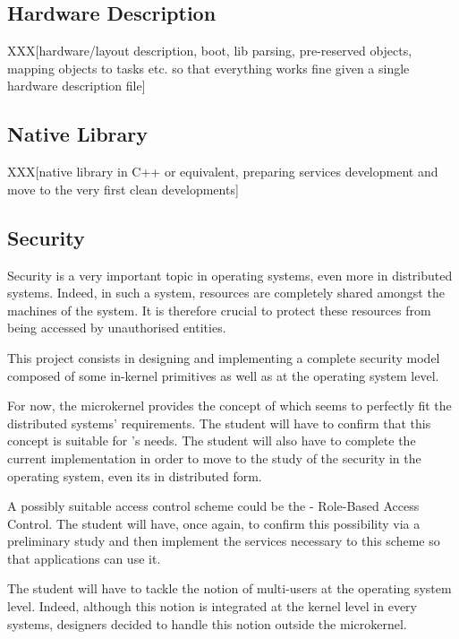 \begin{multicols}{2}
%
%

\subsection{Hardware Description}

XXX[hardware/layout description, boot, lib parsing, pre-reserved objects,
    mapping objects to tasks etc. so that everything works fine given a
    single hardware description file]

%
%

\subsection{ Native Library}

XXX[native library in C++ or equivalent, preparing services development
    and move to the very first clean developments]

%
%

\subsection{Security}

Security is a very important topic in operating systems, even more in
distributed systems. Indeed, in such a system, resources are completely
shared amongst the machines of the system. It is therefore crucial to protect
these resources from being accessed by unauthorised entities.

This project consists in designing and implementing a complete security
model composed of some in-kernel primitives as well as at the operating
system level.

For now, the  microkernel provides the concept of 
which seems to perfectly fit the distributed systems' requirements. The student
will have to confirm that this concept is suitable for 's needs. The
student will also have to complete the current implementation in order to move
to the study of the security in the operating system, even its in distributed
form.

A possibly suitable access control scheme could be the  -
Role-Based Access Control. The student will have, once again, to confirm this
possibility via a preliminary study and then implement the services
necessary to this scheme so that applications can use it.

The student will have to tackle the notion of multi-users at the operating
system level. Indeed, although this notion is integrated at the kernel
level in every  systems,  designers decided to handle this
notion outside the microkernel.


\end{multicols}
